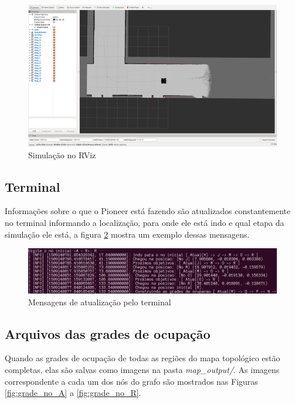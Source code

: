 \documentclass{llncs}
\begin{document}
\begin{figure}
	\centerline{\includegraphics[scale=0.27]{rviz}}
	\caption{Simulação no RViz}
	\label{fig:rviz}
\end{figure}


\subsection{Terminal}
Informações sobre o que o Pioneer está fazendo são atualizados constantemente no terminal informando a localização, para onde ele está indo e qual etapa da simulação ele está, a figura \ref{fig:terminal} mostra um exemplo dessas mensagens.

\begin{figure}
	\centerline{\includegraphics[scale=0.5]{terminal}}
	\caption{Mensagens de atualização pelo terminal}
	\label{fig:terminal}
\end{figure}


\pagebreak
\subsection{Arquivos das grades de ocupação}
Quando as grades de ocupação de todas as regiões do mapa topológico estão completas, elas são salvas como imagens na pasta \textit{map\_output/}. As imagens correspondente a cada um dos nós do grafo são mostrados nas Figuras \ref{fig:grade_no_A} a \ref{fig:grade_no_R}.
\end{document}
